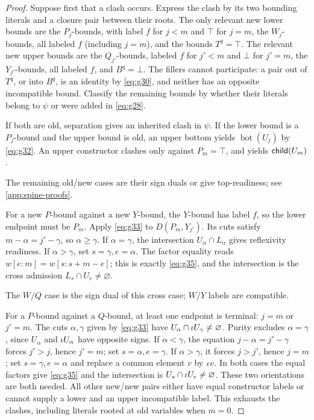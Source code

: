 \begin{proof}Suppose first that a clash occurs. Express the clash by its two
bounding literals and a closure pair between their roots. The only relevant
new lower bounds are the $P_j$-bounds, with label $f$ for $j<m$
and $\top$ for $j=m$, the $W_j$-bounds, all labeled $f$ (including $j=m$), and the bounds $T^q=\top$. The relevant new
upper bounds are the $Q_{j'}$-bounds, labeled $f$ for $j'<m$ and
$\bot$ for $j'=m$, the $Y_{j'}$-bounds, all labeled $f$, and
$B^q=\bot$. The fillers cannot participate: a pair out of $T^q$, or into
$B^q$, is an identity by \eqref{eq:g30}, and neither has an opposite incompatible
bound. Classify the remaining bounds by whether their literals belong to
$\psi$ or were added in \eqref{eq:g28}.

If both are old, separation gives an inherited clash in $\psi$. If the lower bound is a $P_j$-bound and the upper bound
is old, an upper bottom yields $\operatorname{bot}(U_j)$ by \eqref{eq:g32}.
An upper constructor clashes only against $P_m=\top$, and yields
$\mathsf{child}(U_m)$.

The remaining old/new cases are their sign duals or give top-readiness; see \cref{app:spine-proofs}.

For a new $P$-bound against a new $Y$-bound, the $Y$-bound has label $f$,
so the lower endpoint must be $P_m$. Apply \eqref{eq:g33} to $D(P_m,Y_{j'})$. Its cuts satisfy
$m-\alpha=j'-\gamma$, so $\alpha\ge \gamma$. If $\alpha=\gamma$, the intersection
$U_\alpha\cap L_\alpha$ gives reflexivity readiness. If $\alpha>\gamma$, set
$s=\gamma,e=\alpha$. The factor equality reads
$w[e:m]=w[s:s+m-e]$; this is exactly \eqref{eq:g35}, and the intersection is
the cross admission $L_s\cap U_e\ne\varnothing$.

The $W$/$Q$ case is the sign dual of this cross case; $W$/$Y$ labels are compatible.

For a $P$-bound against a $Q$-bound, at least one endpoint is terminal:
$j=m$ or $j'=m$. The cuts $\alpha,\gamma$ given by \eqref{eq:g33} have
$U_\alpha\cap\iota U_\gamma\ne\varnothing$. Purity excludes $\alpha=\gamma$, since
$U_\alpha$ and $\iota U_\alpha$ have opposite signs. If $\alpha<\gamma$, the equation
$j-\alpha=j'-\gamma$ forces $j'>j$, hence $j'=m$; set $s=\alpha,e=\gamma$.
If $\alpha>\gamma$, it forces $j>j'$, hence $j=m$; set $s=\gamma,e=\alpha$ and
replace a common element $v$ by $\iota v$. In both cases the
equal factors give \eqref{eq:g35} and the intersection is
$U_s\cap\iota U_e\ne\varnothing$. These two orientations are both
needed. All other new/new pairs either have equal constructor labels or
cannot supply a lower and an upper incompatible label. This exhausts the
clashes, including literals rooted at old variables when $m=0$.


\end{proof}
